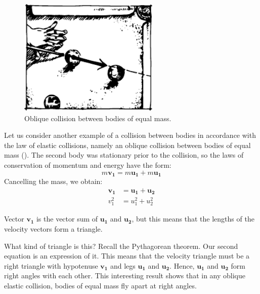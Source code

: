 \begin{figure}[!ht]
\centering
\includegraphics[width=0.6\textwidth]{figures/fig-03-11.pdf}
\caption{Oblique collision between bodies of equal mass.}
\label{fig-3.11}
\end{figure}
Let us consider another example of a collision between
bodies in accordance with the law of elastic collisions,
namely an oblique collision between bodies of equal mass
(). The second body was stationary prior to
the collision, so the laws of conservation of momentum
and energy have the form:
\begin{equation*}%
m \mathbf{v_{1}} = m\mathbf{u_{1}}+ m\mathbf{u_{1}}
\end{equation*}
Cancelling the mass, we obtain:
\begin{align*}%
\mathbf{v_{1}} &= \mathbf{u_{1}}+ \mathbf{u_{2}}\\
v_{1}^{2} &= u_{1}^{2} + u_{2}^{2}
\end{align*}

Vector $\mathbf{v_{1}}$ is the vector sum of $\mathbf{u_{1}}$ and $\mathbf{u_{2}}$, but this means
that the lengths of the velocity vectors form a triangle.

What kind of triangle is this? Recall the Pythagorean
theorem. Our second equation is an expression of it.
This means that the velocity triangle must be a right
triangle with hypotenuse $\mathbf{v_{1}}$ and legs $\mathbf{u_{1}}$ and $\mathbf{u_{2}}$. Hence, $\mathbf{u_{1}}$ and $\mathbf{u_{2}}$ form right angles with each other. This interesting result shows that in any oblique elastic collision, bodies of equal mass fly apart at right angles.
